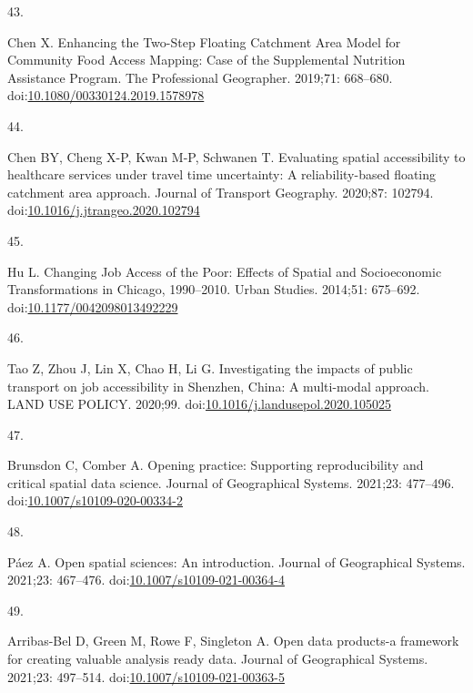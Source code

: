 \documentclass[10pt,letterpaper]{article}
\newlength{\cslhangindent}
\newlength{\csllabelwidth}
\newlength{\cslentryspacingunit} %
\newenvironment{CSLReferences}[2] %
 {%
  \setlength{\parindent}{0pt}
  \ifodd #1
  \let\oldpar\par
  \def\par{\hangindent=\cslhangindent\oldpar}
  \fi
  \setlength{\parskip}{#2\cslentryspacingunit}
 }%
 {}
\newcommand{\CSLLeftMargin}[1]{\parbox[t]{\csllabelwidth}{#1}}
\newcommand{\CSLRightInline}[1]{\parbox[t]{\linewidth - \csllabelwidth}{#1}\break}
\begin{document}
\begin{CSLReferences}{0}{0}
\leavevmode{}%
\CSLLeftMargin{43. }%
\CSLRightInline{Chen X. Enhancing the {Two}-{Step} {Floating}
{Catchment} {Area} {Model} for {Community} {Food} {Access} {Mapping}:
{Case} of the {Supplemental} {Nutrition} {Assistance} {Program}. The
Professional Geographer. 2019;71: 668--680.
doi:\href{https://doi.org/10.1080/00330124.2019.1578978}{10.1080/00330124.2019.1578978}}

\leavevmode{}%
\CSLLeftMargin{44. }%
\CSLRightInline{Chen BY, Cheng X-P, Kwan M-P, Schwanen T. Evaluating
spatial accessibility to healthcare services under travel time
uncertainty: {A} reliability-based floating catchment area approach.
Journal of Transport Geography. 2020;87: 102794.
doi:\href{https://doi.org/10.1016/j.jtrangeo.2020.102794}{10.1016/j.jtrangeo.2020.102794}}

\leavevmode{}%
\CSLLeftMargin{45. }%
\CSLRightInline{Hu L. Changing {Job} {Access} of the {Poor}: {Effects}
of {Spatial} and {Socioeconomic} {Transformations} in {Chicago},
1990--2010. Urban Studies. 2014;51: 675--692.
doi:\href{https://doi.org/10.1177/0042098013492229}{10.1177/0042098013492229}}

\leavevmode{}%
\CSLLeftMargin{46. }%
\CSLRightInline{Tao Z, Zhou J, Lin X, Chao H, Li G. Investigating the
impacts of public transport on job accessibility in {Shenzhen}, {China}:
A multi-modal approach. LAND USE POLICY. 2020;99.
doi:\href{https://doi.org/10.1016/j.landusepol.2020.105025}{10.1016/j.landusepol.2020.105025}}

\leavevmode{}%
\CSLLeftMargin{47. }%
\CSLRightInline{Brunsdon C, Comber A. Opening practice: Supporting
reproducibility and critical spatial data science. Journal of
Geographical Systems. 2021;23: 477--496.
doi:\href{https://doi.org/10.1007/s10109-020-00334-2}{10.1007/s10109-020-00334-2}}

\leavevmode{}%
\CSLLeftMargin{48. }%
\CSLRightInline{Páez A. Open spatial sciences: An introduction. Journal
of Geographical Systems. 2021;23: 467--476.
doi:\href{https://doi.org/10.1007/s10109-021-00364-4}{10.1007/s10109-021-00364-4}}

\leavevmode{}%
\CSLLeftMargin{49. }%
\CSLRightInline{Arribas-Bel D, Green M, Rowe F, Singleton A. Open data
products-a framework for creating valuable analysis ready data. Journal
of Geographical Systems. 2021;23: 497--514.
doi:\href{https://doi.org/10.1007/s10109-021-00363-5}{10.1007/s10109-021-00363-5}}


\end{CSLReferences}
\end{document}
